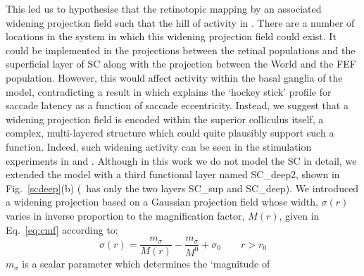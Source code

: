 \documentclass{frontiersSCNS}
\begin{document}
This led us to hypothesise that the retinotopic mapping  by an associated widening projection field such that
the hill of activity in . There are a number of
locations in the system in which this widening projection field could
exist. It could be implemented in the projections between the retinal
populations and the superficial layer of SC along with the projection
between the World and the FEF population. However, this would affect
activity within the basal ganglia of the model, contradicting a result
in \cite{cope_basal_2017} which explains the `hockey stick' profile
for saccade latency as a function of saccade eccentricity. Instead, we
suggest that a widening projection field is encoded within the
superior colliculus itself, a complex, multi-layered structure which
could quite plausibly support such a function. Indeed, such widening
activity can be seen in the stimulation experiments
in \cite{vokoun_intralaminar_2010} and \cite{vokoun_response_2014}.
%
%
Although in this work we do not model
the SC in detail, we extended the model with a third functional layer
named SC\_deep2, shown in Fig.~\ref{scdeep}(b) (\ccg~has only the two
layers SC\_sup and SC\_deep). We introduced a widening projection
based on a Gaussian projection field whose width, $\sigma(r)$ varies
in inverse proportion to the magnification factor, $M(r)$, given in
Eq.~\ref{eq:cmf} according to:
\begin{equation} \label{eq:sigmar}
\sigma(r) = \frac{m_{\sigma}}{M(r)} - \frac{m_{\sigma}}{M^0} + \sigma_0 \qquad r > r_0
\end{equation}
$m_{\sigma}$ is a scalar parameter which determines the `magnitude of
\end{document}
